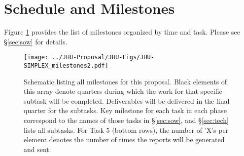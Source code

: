 \section{Schedule and Milestones}
\label{sec:milestones}


Figure \ref{fig:milestones} provides the list of milestones organized by time and task.  Please see \S \ref{sec:sow} for details.

\begin{figure}[h!]
\centering
\texttt{[image: ../JHU-Proposal/JHU-Figs/JHU-SIMPLEX\_milestones2.pdf]}
\caption[Schematic listing all milestones for this proposal.]{Schematic listing all milestones for this proposal.  Black elements of this array denote quarters during which the work for that specific subtask will be completed.  Deliverables will be delivered in the final quarter for the subtasks.  Key milestone for each task in each phase correspond to the names of those tasks in \S \ref{sec:sow}, and \S \ref{sec:tech} lists all subtasks.  For Task 5 (bottom rows), the number of 'X's per element denotes the number of times the reports will be generated and sent.}
\label{fig:milestones}
\end{figure}
